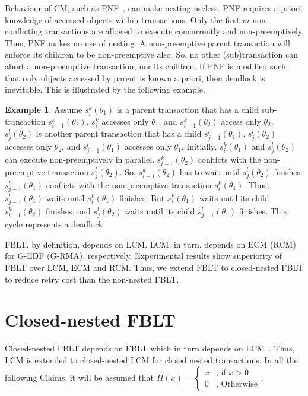 \documentclass[10pt, conference, compsocconf]{IEEEtran}
\begin{document}
Behaviour of CM, such as PNF~\cite{pnf_dac_asp}, can make nesting useless. PNF requires a priori knowledge of accessed objects within transactions. Only the first $m$ non-conflicting transactions are allowed to execute concurrently and non-preemptively. Thus, PNF makes no use of nesting. A non-preemptive parent transaction will enforce its children to be non-preemptive also. So, no other (sub)transaction can abort a non-preemptive transaction, nor its children. If PNF is modified such that only objects accessed by parent is known a priori, then deadlock is inevitable. This is illustrated by the following example.

\textbf{Example 1}\label{Example-1:pnf_nesting_deadlock}: Assume $s_{i}^{k}(\theta_{1})$ is a parent transaction that has a child sub-transaction $s_{i-1}^{k}(\theta_{2})$. $s_{i}^{k}$ accesses only $\theta_{1}$, and $s_{i-1}^{k}(\theta_{2})$ access only $\theta_{2}$. $s_{j}^{l}(\theta_{2})$ is another parent transaction that has a child $s_{j-1}^{l} (\theta_{1})$. $s_{j}^{l}(\theta_{2})$ accesses only $\theta_{2}$, and $s_{j-1}^{l}(\theta_{1})$ accesses only $\theta_{1}$. Initially, $s_{i}^{k}(\theta_{1})$ and $s_{j}^{l}(\theta_{2})$ can execute non-preemptively in parallel. $s_{i-1}^{k}(\theta_{2})$ conflicts with the non-preemptive transaction $s_{j}^{l}(\theta_{2})$. So, $s_{i-1}^{k}(\theta_{2})$ has to wait until $s_{j}^{l}(\theta_{2})$ finishes. $s_{j-1}^{l}(\theta_{1})$ conflicts with the non-preemptive transaction $s_{i}^{k}(\theta_{1})$. Thus, $s_{j-1}^{l}(\theta_{1})$ waits until $s_{i}^{k}(\theta_{1})$ finishes. But $s_{i}^{k}(\theta_{1})$ waits until its child $s_{i-1}^{k}(\theta_{2})$ finishes, and $s_{j}^{l}(\theta_{2})$ waits until its child $s_{j-1}^{l}(\theta_{1})$ finishes. This cycle represents a deadlock.

FBLT\cite{fblt}, by definition, depends on LCM. LCM, in turn, depends
on ECM (RCM) for G-EDF (G-RMA), respectively. Experimental results
show superiority of FBLT over LCM, ECM and RCM\cite{fblt}. Thus, we extend FBLT to closed-nested FBLT to reduce retry cost than the non-nested FBLT.

\section{Closed-nested FBLT}\label{sec:closed_nested_fblt_design}

Closed-nested FBLT depends on FBLT which in turn depends on LCM~\cite{lcmdac2012}. Thus, LCM is extended to closed-nested LCM for closed nested transactions. In all the following Claims, it will be assumed that 
$\Pi(x)=\begin{cases}
x & \mbox{, if }x>0\\
0 & \mbox{, Otherwise}
\end{cases}$.
\end{document}
